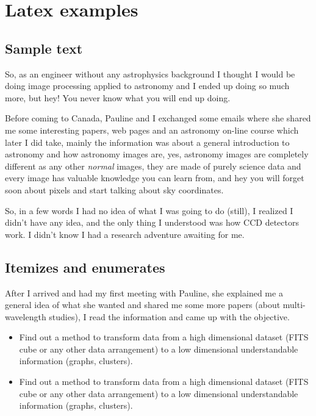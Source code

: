 \chapter{Latex examples}

\section{Sample text}
So, as an engineer without any astrophysics background I thought I would be doing image processing applied to astronomy and I ended up doing so much more, but hey! You never know what you will end up doing.

Before coming to Canada, Pauline and I exchanged some emails where she shared me some interesting papers, web pages and an astronomy on-line course which later I did take, mainly the information was about a general introduction to astronomy and how astronomy images are, yes, astronomy images are completely different as any other \emph{normal} images, they are made of purely science data and every image has valuable knowledge you can learn from, and hey you will forget soon about pixels and start talking about sky coordinates.

So, in a few words I had no idea of what I was going to do (still), I realized I didn't have any idea, and the only thing I understood was how CCD detectors work. I didn't know I had a research adventure awaiting for me.

\section{Itemizes and enumerates}
After I arrived and had my first meeting with Pauline, she explained me a general idea of what she wanted and shared me some more papers (about multi-wavelength studies), I read the information and came up with the objective.

\begin{itemize}
\item Find out a method to transform data from a high dimensional dataset (FITS cube or any other data arrangement) to a low dimensional understandable information (graphs, clusters).
\item Find out a method to transform data from a high dimensional dataset (FITS cube or any other data arrangement) to a low dimensional understandable information (graphs, clusters).
\end{itemize}


